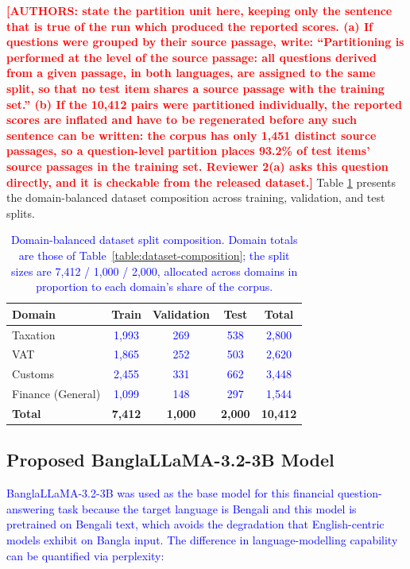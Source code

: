 \documentclass{article}
\newcommand{\revised}[1]{\textcolor{blue}{#1}}
\newcommand{\needsnum}[1]{\textcolor{red}{\textbf{[#1]}}}
\newcommand{\revised}[1]{#1}
\newcommand{\needsnum}[1]{#1}
\begin{document}
\needsnum{AUTHORS: state the partition unit here, keeping only the sentence that is true
of the run which produced the reported scores. (a) If questions were grouped by their
source passage, write: ``Partitioning is performed at the level of the source passage:
all questions derived from a given passage, in both languages, are assigned to the same
split, so that no test item shares a source passage with the training set.'' (b) If the
10,412 pairs were partitioned individually, the reported scores are inflated and have to
be regenerated before any such sentence can be written: the corpus has only 1,451
distinct source passages, so a question-level partition places 93.2\% of test items'
source passages in the training set. Reviewer 2(a) asks this question directly, and it is
checkable from the released dataset.} Table
\ref{table:dataset-splits} presents the domain-balanced dataset composition across
training, validation, and test splits.

\begin{table}[!h]
\centering
\caption{\revised{Domain-balanced dataset split composition. Domain totals are those of
Table~\ref{table:dataset-composition}; the split sizes are 7{,}412 / 1{,}000 / 2{,}000,
allocated across domains in proportion to each domain's share of the corpus.}}
\label{table:dataset-splits}
\begin{tabular}{lcccc}
\hline
\textbf{Domain} & \textbf{Train} & \textbf{Validation} & \textbf{Test} & \textbf{Total} \\
\hline
Taxation & \revised{1,993} & \revised{269} & \revised{538} & \revised{2,800} \\
VAT & \revised{1,865} & \revised{252} & \revised{503} & \revised{2,620} \\
Customs & \revised{2,455} & \revised{331} & \revised{662} & \revised{3,448} \\
Finance (General) & \revised{1,099} & \revised{148} & \revised{297} & \revised{1,544} \\
\hline
\textbf{Total} & \textbf{7,412} & \textbf{1,000} & \textbf{2,000} & \textbf{10,412} \\
\hline
\end{tabular}
\end{table}

\subsection{Proposed BanglaLLaMA-3.2-3B Model}

\revised{BanglaLLaMA-3.2-3B was used as the base model for this financial
question-answering task because the target language is Bengali and this model is
pretrained on Bengali text, which avoids the degradation that English-centric models
exhibit on Bangla input. The difference in language-modelling capability can be
quantified via perplexity:}
\end{document}
